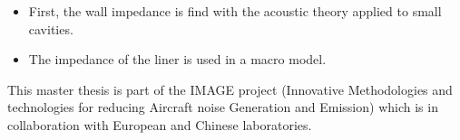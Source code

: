 \begin{itemize}
    \item First, the wall impedance is find with the acoustic theory applied to small cavities.
    \item The impedance of the liner is used in a macro model.
\end{itemize}
This master thesis is part of the IMAGE project (Innovative Methodologies and technologies for reducing Aircraft noise Generation and Emission) which is in collaboration with European and Chinese laboratories.
\clearpage
